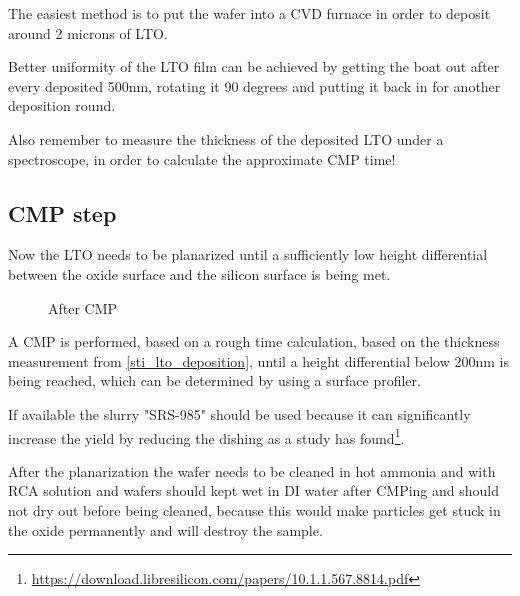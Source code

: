 The easiest method is to put the wafer into a CVD furnace in order to deposit around 2 microns of LTO.

Better uniformity of the LTO film can be achieved by getting the boat out after every deposited 500nm, rotating it 90 degrees and putting it back in for another deposition round.

Also remember to measure the thickness of the deposited LTO under a spectroscope, in order to calculate the approximate CMP time!

\newpage

\subsection{CMP step}\label{sti_cmp_step}

Now the LTO needs to be planarized until a sufficiently low height differential between the oxide surface and the silicon surface is being met.

\begin{figure}[H]
	\centering
	\begin{tikzpicture}[node distance = 3cm, auto, thick,scale=\CrossSectionOnly, every node/.style={transform shape}]
		
	\end{tikzpicture}
	\begin{tikzpicture}[node distance = 3cm, auto, thick,scale=\CrossSectionOnly, every node/.style={transform shape}]
		
	\end{tikzpicture}
	\begin{tikzpicture}[node distance = 3cm, auto, thick,scale=\CrossSectionOnly, every node/.style={transform shape}]
		
	\end{tikzpicture}
	\caption{After CMP}
\end{figure}

A CMP is performed, based on a rough time calculation, based on the thickness measurement from \autoref{sti_lto_deposition}, until a height differential below 200nm is being reached, which can be determined by using a surface profiler.

If available the slurry "SRS-985" should be used because it can significantly increase the yield by reducing the dishing as a study has found\footnote{\url{https://download.libresilicon.com/papers/10.1.1.567.8814.pdf}}.

After the planarization the wafer needs to be cleaned in hot ammonia and with RCA solution and wafers should kept wet in DI water after CMPing and should not dry out before being cleaned, because this would make particles get stuck in the oxide permanently and will destroy the sample.

